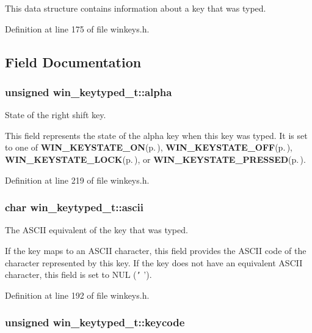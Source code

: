 This data structure contains information about a key that was typed. 



Definition at line 175 of file winkeys.h.

\subsection{Field Documentation}
\subsubsection{\setlength{\rightskip}{0pt plus 5cm}unsigned {\bf win\_\-keytyped\_\-t::alpha}}\label{structwin__keytyped__t_o4}


State of the right shift key. 

This field represents the state of the alpha key when this key was typed. It is set to one of {\bf WIN\_\-KEYSTATE\_\-ON}{\rm (p.\,\pageref{winkeys_8h_a7})}, {\bf WIN\_\-KEYSTATE\_\-OFF}{\rm (p.\,\pageref{winkeys_8h_a6})}, {\bf WIN\_\-KEYSTATE\_\-LOCK}{\rm (p.\,\pageref{winkeys_8h_a8})}, or {\bf WIN\_\-KEYSTATE\_\-PRESSED}{\rm (p.\,\pageref{winkeys_8h_a9})}. 

Definition at line 219 of file winkeys.h.
\subsubsection{\setlength{\rightskip}{0pt plus 5cm}char {\bf win\_\-keytyped\_\-t::ascii}}\label{structwin__keytyped__t_o1}


The ASCII equivalent of the key that was typed. 

If the key maps to an ASCII character, this field provides the ASCII code of the character represented by this key. If the key does not have an equivalent ASCII character, this field is set to NUL ({\tt '} '). 

Definition at line 192 of file winkeys.h.
\subsubsection{\setlength{\rightskip}{0pt plus 5cm}unsigned {\bf win\_\-keytyped\_\-t::keycode}}\label{structwin__keytyped__t_o0}


